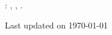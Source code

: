 \hfill
\vfill

{
	\setlength\parindent{0pt}

	\AuthorName{} \AuthorSurname{}: \textit{\Title{}}, \DegreeName{}, \textcopyright{} \CopyrightYear{}.
	\par\hfill{\scriptsize\color{gray}Last updated on \today}
}
